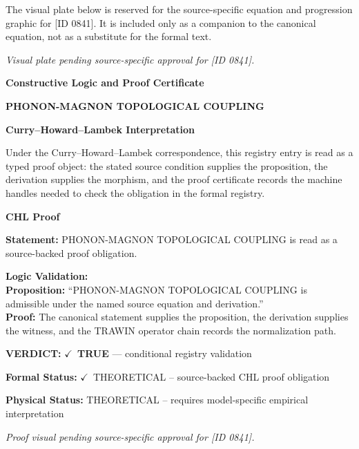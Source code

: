 \begingroup\footnotesize\sloppy
The visual plate below is reserved for the source-specific equation and progression graphic for [ID 0841]. It is included only as a companion to the canonical equation, not as a substitute for the formal text.
\par\endgroup
\begingroup\footnotesize\itshape
Visual plate pending source-specific approval for [ID 0841].
\par\endgroup

\clearpage
\begingroup\tzpsupportsetup
\noindent\textbf{\fontsize{10.8pt}{12.8pt}\selectfont [ID 0841] Constructive Logic and Proof Certificate}\par
\noindent\textbf{\fontsize{10pt}{12pt}\selectfont PHONON-MAGNON TOPOLOGICAL COUPLING}\par
\vspace{0.45em}
\begingroup
\footnotesize
\setlength{\parskip}{0.22em}
\setlength{\parindent}{0pt}
\noindent\textbf{Curry--Howard--Lambek Interpretation}\par
Under the Curry--Howard--Lambek correspondence, this registry entry is read as a typed proof
object: the stated source condition supplies the proposition, the derivation supplies the
morphism, and the proof certificate records the machine handles needed to check the obligation
in the formal registry.

\vspace{0.45em}
\noindent\textbf{CHL Proof}\par
\textbf{Statement:} PHONON-MAGNON TOPOLOGICAL COUPLING is read as a source-backed proof obligation.

\textbf{Logic Validation:}\\
\textbf{Proposition:} ``PHONON-MAGNON TOPOLOGICAL COUPLING is admissible under the named source equation and derivation.''\\
\textbf{Proof:} The canonical statement supplies the proposition, the derivation supplies the witness, and the TRAWIN operator chain records the normalization path.

\textbf{VERDICT:} \ensuremath{\checkmark}\ \textbf{TRUE} --- conditional registry validation

\textbf{Formal Status:} \ensuremath{\checkmark}\ THEORETICAL -- source-backed CHL proof obligation

\textbf{Physical Status:} THEORETICAL -- requires model-specific empirical interpretation
\par\vspace{0.45em}
\par
\vfill
\begingroup\footnotesize\itshape
Proof visual pending source-specific approval for [ID 0841].
\par\endgroup
\vfill
\endgroup
\endgroup
